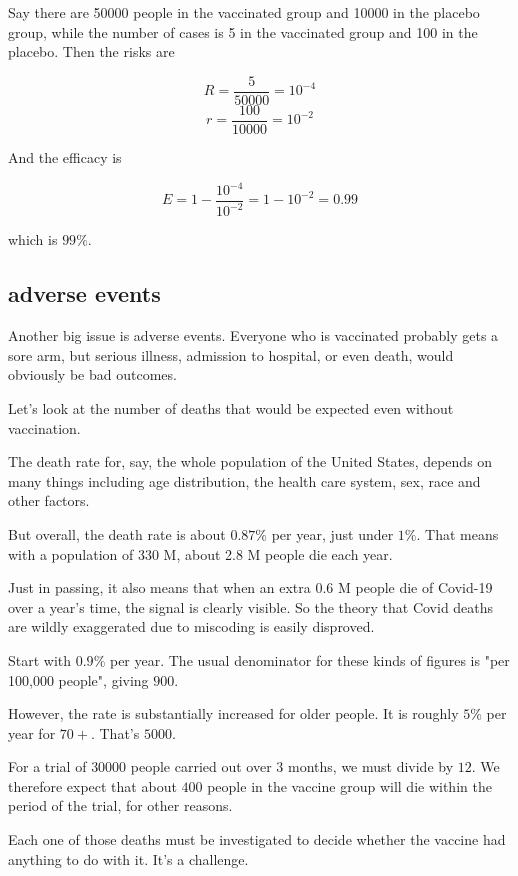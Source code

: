 \documentclass[11pt, oneside]{article}
\begin{document}
Say there are 50000 people in the vaccinated group and 10000 in the placebo group, while the number of cases is 5 in the vaccinated group and 100 in the placebo.  Then the risks are

\[ R = \frac{5}{50000} = 10^{-4} \]
\[ r = \frac{100}{10000} = 10^{-2} \]

And the efficacy is

\[ E = 1 -  \frac{10^{-4}}{10^{-2}} = 1 - 10^{-2} = 0.99 \]

which is $99 \%$.

\subsection*{adverse events}

Another big issue is adverse events.  Everyone who is vaccinated probably gets a sore arm, but serious illness, admission to hospital, or even death, would obviously be bad outcomes.

Let's look at the number of deaths that would be expected even without vaccination.

The death rate for, say, the whole population of the United States, depends on many things including age distribution, the health care system, sex, race and other factors.

But overall, the death rate is about $0.87 \%$ per year, just under $1 \%$.  That means with a population of 330 M, about 2.8 M people die each year.  

Just in passing, it also means that when an extra 0.6 M people die of Covid-19 over a year's time, the signal is clearly visible.  So the theory that Covid deaths are wildly exaggerated due to miscoding is easily disproved.

Start with $0.9 \%$ per year.  The usual denominator for these kinds of figures is "per 100,000 people", giving $900$.

However, the rate is substantially increased for older people.  It is roughly $5 \%$ per year for $70+$.  That's $5000$.

For a trial of $30000$ people carried out over $3$ months, we must divide by $12$.  We therefore expect that about $400$ people in the vaccine group will die within the period of the trial, for other reasons.

Each one of those deaths must be investigated to decide whether the vaccine had anything to do with it.  It's a challenge.
\end{document}
